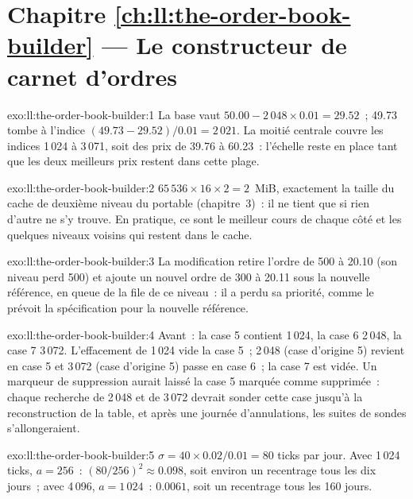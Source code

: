 \section*{Chapitre \ref{ch:ll:the-order-book-builder} --- Le constructeur de carnet d'ordres}

\begin{solution}{exo:ll:the-order-book-builder:1}
La base vaut $50.00 - 2\,048 \times 0.01 = 29.52$~; 49.73 tombe à l'indice $(49.73 - 29.52)/0.01 = 2\,021$. La moitié centrale couvre
les indices 1\,024 à 3\,071, soit des prix de 39.76 à 60.23~: l'échelle reste en place tant que les deux meilleurs prix restent dans cette plage.
\end{solution}

\begin{solution}{exo:ll:the-order-book-builder:2}
$65\,536 \times 16 \times 2 = 2$~MiB, exactement la taille du cache de deuxième niveau du portable (chapitre~3)~: il ne tient que si rien d'autre
ne s'y trouve. En pratique, ce sont le meilleur cours de chaque côté et les quelques niveaux voisins qui restent dans le cache.
\end{solution}

\begin{solution}{exo:ll:the-order-book-builder:3}
La modification retire l'ordre de 500 à 20.10 (son niveau perd 500) et ajoute un nouvel ordre de 300 à 20.11 sous la nouvelle
référence, en queue de la file de ce niveau~: il a perdu sa priorité, comme le prévoit la spécification pour la nouvelle référence.
\end{solution}

\begin{solution}{exo:ll:the-order-book-builder:4}
Avant~: la case 5 contient 1\,024, la case 6 2\,048, la case 7 3\,072. L'effacement de 1\,024 vide la case 5~; 2\,048 (case d'origine 5) revient en case 5 et
3\,072 (case d'origine 5) passe en case 6~; la case 7 est vidée. Un marqueur de suppression aurait laissé la case 5 marquée comme supprimée~: chaque recherche de 2\,048 et de 3\,072
devrait sonder cette case jusqu'à la reconstruction de la table, et après une journée d'annulations, les suites de sondes s'allongeraient.
\end{solution}

\begin{solution}{exo:ll:the-order-book-builder:5}
$\sigma = 40 \times 0.02 / 0.01 = 80$ ticks par jour. Avec 1\,024 ticks, $a = 256$~: $(80/256)^2 \approx 0.098$, soit environ un
recentrage tous les dix jours~; avec 4\,096, $a = 1\,024$~: $0.0061$, soit un recentrage tous les 160 jours.
\end{solution}

